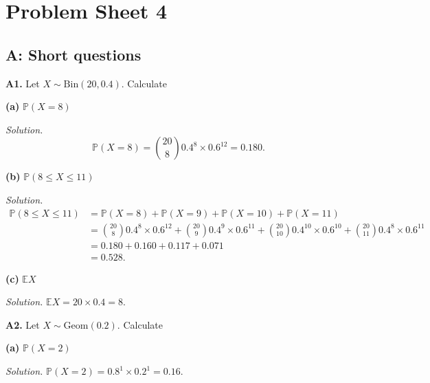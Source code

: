 \documentclass[
  a4paper,
]{book}
\theoremstyle{definition}
\theoremstyle{definition}
\theoremstyle{definition}
\theoremstyle{definition}
\theoremstyle{remark}
\begin{document}
\hypertarget{P4-solutions}{%
\section*{Problem Sheet 4}\label{P4-solutions}}

\hypertarget{P4-short-solutions}{%
\subsection*{A: Short questions}\label{P4-short-solutions}}

\textbf{A1.} Let \(X \sim \text{Bin}(20, 0.4)\). Calculate

\textbf{(a)} \(\mathbb P(X = 8)\)

\begin{myanswers}
\emph{Solution.}
\[ \mathbb P(X = 8) = \binom{20}{8} 0.4^8 \times 0.6^{12} = 0.180 . \]

\end{myanswers}

\textbf{(b)} \(\mathbb P(8 \leq X \leq 11)\)

\begin{myanswers}
\emph{Solution.}
\begin{align*}
\mathbb P(8 \leq X \leq 11) &= \mathbb P(X = 8) + \mathbb P(X = 9) + \mathbb P(X = 10) + \mathbb P(X = 11) \\ 
&= \binom{20}{8} 0.4^8 \times 0.6^{12} + \binom{20}{9} 0.4^9 \times 0.6^{11} + \binom{20}{10} 0.4^10 \times 0.6^{10} + \binom{20}{11} 0.4^8 \times 0.6^{11} \\
&= 0.180 + 0.160 + 0.117 + 0.071 \\
&= 0.528 .
\end{align*}

\end{myanswers}

\textbf{(c)} \(\mathbb EX\)

\begin{myanswers}
\emph{Solution.} \(\mathbb EX = 20 \times 0.4 = 8\).

\end{myanswers}

\textbf{A2.} Let \(X \sim \text{Geom}(0.2)\). Calculate

\textbf{(a)} \(\mathbb P(X = 2)\)

\begin{myanswers}
\emph{Solution.} \(\mathbb P(X = 2) = 0.8^1 \times 0.2^1 = 0.16\).

\end{myanswers}
\end{document}
